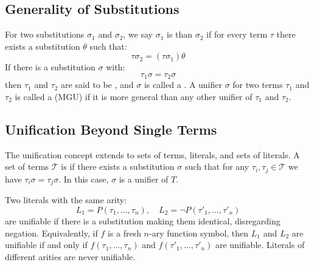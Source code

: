\subsection{Generality of  Substitutions}\label{subsec:generality-of-substitutions}
For two substitutions \(\sigma_1\) and \(\sigma_2\), we say \(\sigma_1\) is  than \(\sigma_2\) if for every term \(\tau\) there exists a substitution \(\theta\) such that:
\begin{equation}  
  \tau\sigma_2 = (\tau\sigma_1)\theta
\end{equation}
If there is a substitution \(\sigma\) with:
\begin{equation}
\tau_1\sigma = \tau_2\sigma
\end{equation}
then \(\tau_1\) and \(\tau_2\) are said to be , and \(\sigma\) is called a .
A unifier \(\sigma\) for two terms \(\tau_1\) and \(\tau_2\) is called a  (MGU) if it is more general than any other unifier of \(\tau_1\) and \(\tau_2\).

\subsection{Unification Beyond Single Terms}\label{subsec:unification-beyond-single-terms}
The unification concept extends to sets of terms, literals, and sets of literals.  
A set of terms \(\mathcal{T}\) is  if there exists a substitution \(\sigma\) such that for any \(\tau_i, \tau_j \in \mathcal{T}\) we have \(\tau_i\sigma = \tau_j\sigma\). In this case, \(\sigma\) is a unifier of \(T\).

Two literals with the same arity:
\begin{equation}
L_1 = P(\tau_1, \ldots, \tau_n), \quad L_2 = \neg P(\tau'_1, \ldots, \tau'_n)
\end{equation}
are unifiable if there is a substitution making them identical, disregarding negation. Equivalently, if \(f\) is a fresh \(n\)-ary function symbol, then \(L_1\) and \(L_2\) are unifiable if and only if \(f(\tau_1, \ldots, \tau_n)\) and \(f(\tau'_1, \ldots, \tau'_n)\) are unifiable.  
Literals of different arities are never unifiable.

